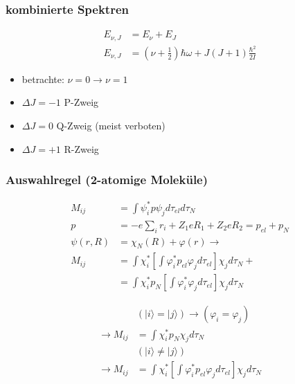 \subsubsection*{kombinierte Spektren}

\begin{equation*}
    \begin{aligned}
        E_{\nu, J} &= E_\nu + E_J \\
        E_{\nu, J} &= \left(\nu + \frac{1}{2}\right) \hbar \omega + J(J+1) \frac{\hbar^2}{2I}
    \end{aligned}
\end{equation*}

\begin{itemize}
    \itemsep 0pt
    \item betrachte: $\nu = 0 \rightarrow \nu = 1$
    \item $\Delta J = -1$ P-Zweig
    \item $\Delta J = 0$ Q-Zweig (meist verboten)
    \item $\Delta J = +1$ R-Zweig
\end{itemize}

\subsubsection*{Auswahlregel (2-atomige Moleküle)}
\begin{equation*}
    \begin{aligned}
        M_{ij} &= \int \psi_i^* p \psi_j d\tau_{el} d\tau_N \\
        p &= -e \sum_i r_i + Z_1 eR_1 + Z_2 e R_2 = p_{el} + p_N \\
        \psi(r,R) &= \chi_N(R) + \varphi(r) \rightarrow \\
        M_{ij} &= \int \chi_i^* \left[\int \varphi_i^* p_{el} \varphi_j d\tau_{el}\right] \chi_j d\tau_{N} + \\
                &= \int \chi_i^* p_N \left[\int \varphi_i^* \varphi_j d\tau_{el}\right] \chi_j d\tau_{N}
    \end{aligned}
\end{equation*}

\begin{equation*}
    \begin{aligned}
        &(|i\rangle = |j\rangle) \rightarrow (\varphi_i = \varphi_j) \\
        \rightarrow M_{ij} &= \int \chi_i^* p_N \chi_j d\tau_N \\
        &(|i\rangle \neq |j\rangle) \\
        \rightarrow M_{ij} &= \int \chi_i^* \left[\int \varphi_i^* p_{el} \varphi_j d\tau_{el}\right] \chi_j d\tau_{N}
    \end{aligned}
\end{equation*}